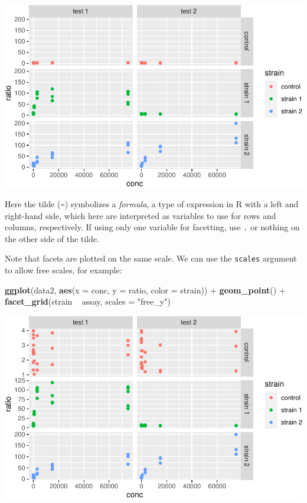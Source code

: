\documentclass[]{book}
\newenvironment{Shaded}{}{}
\newcommand{\DataTypeTok}[1]{\textcolor[rgb]{0.56,0.13,0.00}{#1}}
\newcommand{\KeywordTok}[1]{\textcolor[rgb]{0.00,0.44,0.13}{\textbf{#1}}}
\newcommand{\NormalTok}[1]{#1}
\newcommand{\OperatorTok}[1]{\textcolor[rgb]{0.40,0.40,0.40}{#1}}
\newcommand{\StringTok}[1]{\textcolor[rgb]{0.25,0.44,0.63}{#1}}
\begin{document}
\begin{center}\includegraphics[width=\textwidth]{TRES-Tidy-Tutorial_files/figure-latex/unnamed-chunk-131-1} \end{center}

Here the tilde (\texttt{\textasciitilde{}}) symbolizes a \emph{formula}, a type of expression in R with a left and right-hand side, which here are interpreted as variables to use for rows and columns, respectively. If using only one variable for facetting, use \texttt{.} or nothing on the other side of the tilde.

Note that facets are plotted on the same scale. We can use the \texttt{scales} argument to allow free scales, for example:

\begin{Shaded}
\begin{Highlighting}[]
\KeywordTok{ggplot}\NormalTok{(data2, }\KeywordTok{aes}\NormalTok{(}\DataTypeTok{x =}\NormalTok{ conc, }\DataTypeTok{y =}\NormalTok{ ratio, }\DataTypeTok{color =}\NormalTok{ strain)) }\OperatorTok{+}
\StringTok{  }\KeywordTok{geom_point}\NormalTok{() }\OperatorTok{+}
\StringTok{  }\KeywordTok{facet_grid}\NormalTok{(strain }\OperatorTok{~}\StringTok{ }\NormalTok{assay, }\DataTypeTok{scales =} \StringTok{"free_y"}\NormalTok{)}
\end{Highlighting}
\end{Shaded}

\begin{center}\includegraphics[width=\textwidth]{TRES-Tidy-Tutorial_files/figure-latex/unnamed-chunk-132-1} \end{center}
\end{document}
